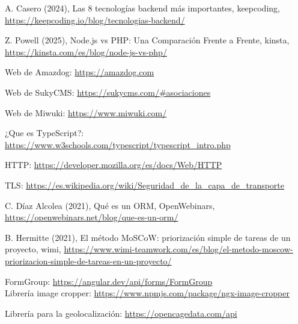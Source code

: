 \begin{thebibliography}{9}
A. Casero (2024), Las 8 tecnologías backend más importantes, keepcoding,  \href{https://keepcoding.io/blog/tecnologias-backend/}{https://keepcoding.io/blog/tecnologias-backend/}

Z. Powell (2025), Node.js vs PHP: Una Comparación Frente a Frente, kinsta, \href{https://kinsta.com/es/blog/node-js-vs-php/}{https://kinsta.com/es/blog/node-js-vs-php/}

Web de Amazdog: \href{https://amazdog.com}{https://amazdog.com}

Web de SukyCMS: \href{https://sukycms.com/\#asociaciones}{https://sukycms.com/\#asociaciones}

Web de Miwuki: \href{https://www.miwuki.com/}{https://www.miwuki.com/}

¿Que es TypeScript?: \href{https://www.w3schools.com/typescript/typescript_intro.php}{https://www.w3schools.com/typescript/typescript\_intro.php}

HTTP: \href{https://developer.mozilla.org/es/docs/Web/HTTP}{https://developer.mozilla.org/es/docs/Web/HTTP}

TLS: \href{https://es.wikipedia.org/wiki/Seguridad_de_la_capa_de_transporte}{https://es.wikipedia.org/wiki/Seguridad\_de\_la\_capa\_de\_transporte}

C. Díaz Alcolea (2021), Qué es un ORM, OpenWebinars, \href{https://openwebinars.net/blog/que-es-un-orm/}{https://openwebinars.net/blog/que-es-un-orm/}

B. Hermitte (2021), El método MoSCoW: priorización simple de tareas de un proyecto, wimi, \href{https://www.wimi-teamwork.com/es/blog/el-metodo-moscow-priorizacion-simple-de-tareas-en-un-proyecto/}{https://www.wimi-teamwork.com/es/blog/el-metodo-moscow-priorizacion-simple-de-tareas-en-un-proyecto/}



FormGroup: \href{https://angular.dev/api/forms/FormGroup}{https://angular.dev/api/forms/FormGroup}\\


Librería image cropper: \href{https://www.npmjs.com/package/ngx-image-cropper}{https://www.npmjs.com/package/ngx-image-cropper}

Librería para la geolocalización: \href{https://opencagedata.com/api}{https://opencagedata.com/api}\\


\end{thebibliography}
